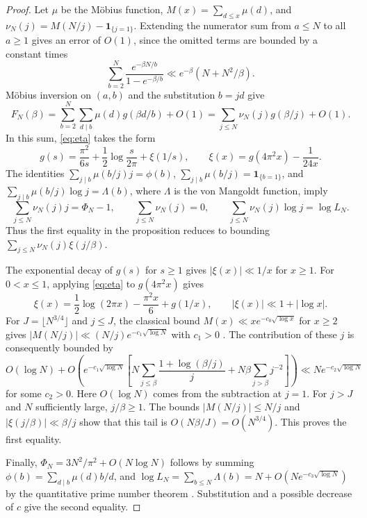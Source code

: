 \documentclass[11pt]{amsart}
\theoremstyle{remark}
\begin{document}
\begin{proof}
Let $\mu$ be the M\"obius function, $M(x)=\sum_{d\le x}\mu(d)$, and $\nu_N(j)=M(N/j)-\mathbf1_{\{j=1\}}$. Extending the numerator sum from $a\le N$ to all $a\ge1$ gives an error of $O(1)$, since the omitted terms are bounded by a constant times
\[
 \sum_{b=2}^N \frac{e^{-\beta N/b}}{1-e^{-\beta/b}}
 \ll e^{-\beta}(N+N^2/\beta).
\]
M\"obius inversion on $(a,b)$ and the substitution $b=jd$ give
\[
 F_N(\beta)=\sum_{b=2}^N\sum_{d\mid b}\mu(d)g(\beta d/b)+O(1)
           =\sum_{j\le N}\nu_N(j)g(\beta/j)+O(1).
\]
In this sum, \eqref{eq:eta} takes the form
\[
 g(s)=\frac{\pi^2}{6s}+\frac12\log\frac{s}{2\pi}+\xi(1/s),
 \qquad \xi(x)=g(4\pi^2x)-\frac1{24x}.
\]
The identities $\sum_{j\mid b}\mu(b/j)j=\phi(b)$, $\sum_{j\mid b}\mu(b/j)=\mathbf1_{\{b=1\}}$, and $\sum_{j\mid b}\mu(b/j)\log j=\Lambda(b)$, where $\Lambda$ is the von Mangoldt function, imply
\[
 \sum_{j\le N}\nu_N(j)j=\Phi_N-1,\qquad
 \sum_{j\le N}\nu_N(j)=0,\qquad
 \sum_{j\le N}\nu_N(j)\log j=\log L_N.
\]
Thus the first equality in the proposition reduces to bounding $\sum_{j\le N}\nu_N(j)\xi(j/\beta)$.

The exponential decay of $g(s)$ for $s\ge1$ gives $|\xi(x)|\ll 1/x$ for $x\ge1$. For $0<x\le1$, applying \eqref{eq:eta} to $g(4\pi^2x)$ gives
\[
 \xi(x)=\frac12\log(2\pi x)-\frac{\pi^2x}{6}+g(1/x),
 \qquad |\xi(x)|\ll 1+|\log x|.
\]
For $J=\lfloor N^{3/4}\rfloor$ and $j\le J$, the classical bound $M(x)\ll x e^{-c_0\sqrt{\log x}}$ for $x\ge2$ gives $|M(N/j)|\ll (N/j)e^{-c_1\sqrt{\log N}}$ with $c_1>0$ \cite[Section~6.2, (6.17)]{montgomery-vaughan}. The contribution of these $j$ is consequently bounded by
\[
 O(\log N)+ O\!\left(e^{-c_1\sqrt{\log N}}
  \left[N\sum_{j\le\beta}\frac{1+\log(\beta/j)}{j}
        +N\beta\sum_{j>\beta}j^{-2}\right]\right)
 \ll N e^{-c_2\sqrt{\log N}}
\]
for some $c_2>0$. Here $O(\log N)$ comes from the subtraction at $j=1$. For $j>J$ and $N$ sufficiently large, $j/\beta\ge1$. The bounds $|M(N/j)|\le N/j$ and $|\xi(j/\beta)|\ll\beta/j$ show that this tail is $O(N\beta/J)=O(N^{3/4})$. This proves the first equality.

Finally, $\Phi_N=3N^2/\pi^2+O(N\log N)$ follows by summing $\phi(b)=\sum_{d\mid b}\mu(d)b/d$, and $\log L_N=\sum_{b\le N}\Lambda(b)=N+O(N e^{-c_3\sqrt{\log N}})$ by the quantitative prime number theorem \cite[Section~6.2, (6.12)]{montgomery-vaughan}. Substitution and a possible decrease of $c$ give the second equality.
\end{proof}
\end{document}
